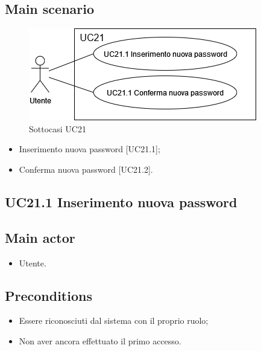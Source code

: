 \documentclass{article}
\begin{document}
        \subsection*{Main scenario}
        \begin{figure}[h]
          \centering
          \includegraphics[width=.8\textwidth, height=.6\textheight, keepaspectratio]{documenti/imgUML/UC21-zoom.drawio.png}
            \caption{Sottocasi UC21}
          \label{fig:UC21_sottocasi}
        \end{figure}
        
        \begin{itemize}
            \item Inserimento nuova password [UC21.1];
            \item Conferma nuova password [UC21.2].
        \end{itemize}
     

        \subsection{UC21.1 Inserimento nuova password}
            \subsection*{Main actor}
        \begin{itemize}
            \item Utente.
        \end{itemize}
        
    \subsection*{Preconditions}
        \begin{itemize}
            \item Essere riconosciuti dal sistema con il proprio ruolo;
            \item Non aver ancora effettuato il primo accesso.
        \end{itemize}
\end{document}
